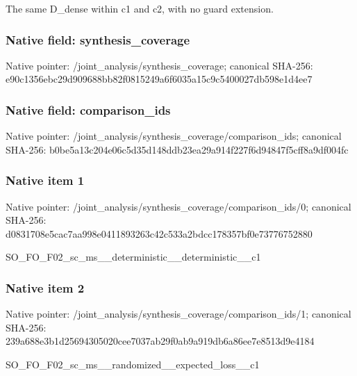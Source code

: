 \documentclass[10pt,a4paper]{article}
\begin{document}
\begingroup\raggedright\sloppy The same D\_\allowbreak{}dense within c1 and c2,\allowbreak{} with no guard extension.\par\endgroup

\subsubsection{Native field: synthesis\_\allowbreak{}coverage}
Native pointer: /joint\_\allowbreak{}analysis/synthesis\_\allowbreak{}coverage; canonical SHA-256: e90c1356ebc29d909688bb82f0815249a6f6035a15c9c5400027db598e1d4ee7

\subsubsection{Native field: comparison\_\allowbreak{}ids}
Native pointer: /joint\_\allowbreak{}analysis/synthesis\_\allowbreak{}coverage/comparison\_\allowbreak{}ids; canonical SHA-256: b0be5a13c204e06c5d35d148ddb23ea29a914f227f6d94847f5cff8a9df004fc

\subsubsection{Native item 1}
Native pointer: /joint\_\allowbreak{}analysis/synthesis\_\allowbreak{}coverage/comparison\_\allowbreak{}ids/0; canonical SHA-256: d0831708e5cac7aa998e0411893263c42c533a2bdcc178357bf0e73776752880

\begingroup\raggedright\sloppy SO\_\allowbreak{}FO\_\allowbreak{}F02\_\allowbreak{}sc\_\allowbreak{}ms\_\allowbreak{}\_\allowbreak{}deterministic\_\allowbreak{}\_\allowbreak{}deterministic\_\allowbreak{}\_\allowbreak{}c1\par\endgroup

\subsubsection{Native item 2}
Native pointer: /joint\_\allowbreak{}analysis/synthesis\_\allowbreak{}coverage/comparison\_\allowbreak{}ids/1; canonical SHA-256: 239a688e3b1d25694305020cee7037ab29f0ab9a919db6a86ee7e8513d9e4184

\begingroup\raggedright\sloppy SO\_\allowbreak{}FO\_\allowbreak{}F02\_\allowbreak{}sc\_\allowbreak{}ms\_\allowbreak{}\_\allowbreak{}randomized\_\allowbreak{}\_\allowbreak{}expected\_\allowbreak{}loss\_\allowbreak{}\_\allowbreak{}c1\par\endgroup
\end{document}
